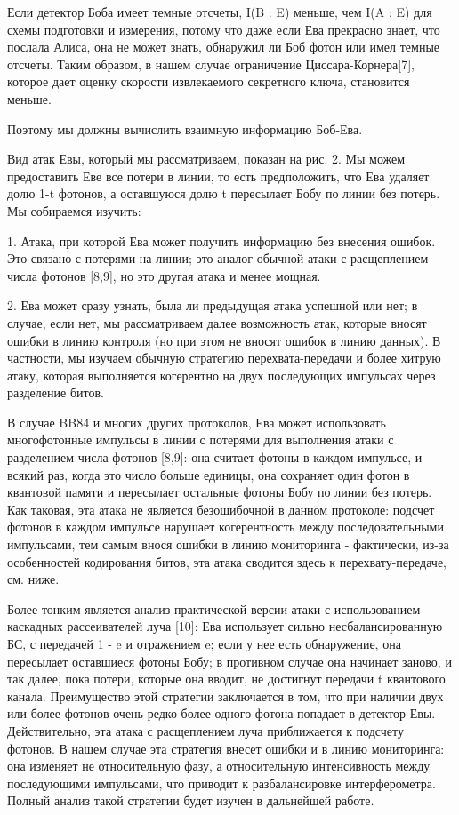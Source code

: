 Если детектор Боба имеет темные отсчеты, I(B : E) меньше, чем I(A : E) для схемы подготовки и измерения, потому что даже если Ева прекрасно знает, что послала Алиса, она не может знать, обнаружил ли Боб фотон или имел темные отсчеты. Таким образом, в нашем случае ограничение Циссара-Корнера[7], которое дает оценку скорости извлекаемого секретного ключа, становится меньше.

Поэтому мы должны вычислить взаимную информацию Боб-Ева.

Вид атак Евы, который мы рассматриваем, показан на рис. 2. Мы можем предоставить Еве все потери в линии, то есть предположить, что Ева удаляет долю 1-t фотонов, а оставшуюся долю t пересылает Бобу по линии без потерь. Мы собираемся изучить:

1. Атака, при которой Ева может получить информацию без внесения ошибок. Это связано с потерями на линии; это аналог обычной атаки с расщеплением числа фотонов [8,9], но это другая атака и менее мощная.


2. Ева может сразу узнать, была ли предыдущая атака успешной или нет; в случае, если нет, мы рассматриваем далее возможность атак, которые вносят ошибки в линию контроля (но при этом не вносят ошибок в линию данных). В частности, мы изучаем обычную стратегию перехвата-передачи и более хитрую атаку, которая выполняется когерентно на двух последующих импульсах через разделение битов.

В случае BB84 и многих других протоколов, Ева может использовать многофотонные импульсы в линии с потерями для выполнения атаки с разделением числа фотонов [8,9]: она считает фотоны в каждом импульсе, и всякий раз, когда это число больше единицы, она сохраняет один фотон в квантовой памяти и пересылает остальные фотоны Бобу по линии без потерь. Как таковая, эта атака не является безошибочной в данном протоколе: подсчет фотонов в каждом импульсе нарушает когерентность между последовательными импульсами, тем самым внося ошибки в линию мониторинга - фактически, из-за особенностей кодирования битов, эта атака сводится здесь к перехвату-передаче, см. ниже.

Более тонким является анализ практической версии атаки с использованием каскадных рассеивателей луча [10]: Ева использует сильно несбалансированную БС, с передачей 1 - e и отражением e; если у нее есть обнаружение, она пересылает оставшиеся фотоны Бобу; в противном случае она начинает заново, и так далее, пока потери, которые она вводит, не достигнут передачи t квантового канала. Преимущество этой стратегии заключается в том, что при наличии двух или более фотонов очень редко более одного фотона попадает в детектор Евы. Действительно, эта атака с расщеплением луча приближается к подсчету фотонов. В нашем случае эта стратегия внесет ошибки и в линию мониторинга: она изменяет не относительную фазу, а относительную интенсивность между последующими импульсами, что приводит к разбалансировке интерферометра. Полный анализ такой стратегии будет изучен в дальнейшей работе.

